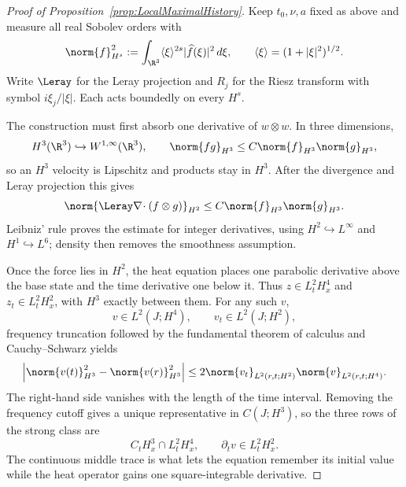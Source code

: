 \begin{proof}[Proof of Proposition~\ref{prop:LocalMaximalHistory}]
Keep \(t_0,\nu,a\) fixed as above and measure all real Sobolev orders with
\[
  \norm{f}_{H^s}^2
  :=\int_{\R^3}\langle\xi\rangle^{2s}
       |\widehat f(\xi)|^2\,d\xi,
  \qquad
  \langle\xi\rangle=(1+|\xi|^2)^{1/2}.
\]
Write \(\Leray\) for the Leray projection and \(R_j\) for the Riesz transform
with symbol \(i\xi_j/|\xi|\).  Each acts boundedly on every \(H^s\).


The construction must first absorb one derivative of \(w\otimes w\).  In three
dimensions,
\[
  H^3(\R^3)\hookrightarrow W^{1,\infty}(\R^3),
  \qquad
  \norm{fg}_{H^3}\leq C\norm{f}_{H^3}\norm{g}_{H^3},
\]
so an \(H^3\) velocity is Lipschitz and products stay in \(H^3\).  After the
divergence and Leray projection this gives
\begin{equation}
  \norm{\Leray\nabla\!\cdot(f\otimes g)}_{H^2}
  \leq C\norm{f}_{H^3}\norm{g}_{H^3}.
  \label{eq:LocalProductEstimate}
\end{equation}
Leibniz’ rule proves the estimate for integer derivatives, using
\(H^2\hookrightarrow L^\infty\) and \(H^1\hookrightarrow L^6\); density then
removes the smoothness assumption.

Once the force lies in \(H^2\), the heat equation places one parabolic derivative
above the base state and the time derivative one below it.  Thus
\(z\in L^2_tH^4_x\) and \(z_t\in L^2_tH^2_x\), with \(H^3\) exactly between
them.  For any such \(v\),
\[
  v\in L^2(J;H^4),
  \qquad
  v_t\in L^2(J;H^2),
\]
frequency truncation followed by the fundamental theorem of calculus and
Cauchy--Schwarz yields
\begin{equation}
  \left|
    \norm{v(t)}_{H^3}^2-\norm{v(r)}_{H^3}^2
  \right|
  \leq
  2\norm{v_t}_{L^2(r,t;H^2)}
   \norm{v}_{L^2(r,t;H^4)}.
  \label{eq:LocalAdjacentTrace}
\end{equation}
The right-hand side vanishes with the length of the time interval.  Removing the
frequency cutoff gives a unique representative in \(C(J;H^3)\), so
the three rows of the strong class are
\[
  C_tH^3_x\cap L^2_tH^4_x,
  \qquad
  \partial_t v\in L^2_tH^2_x.
\]
The continuous middle trace is what lets the equation remember its initial
value while the heat operator gains one square-integrable derivative.



\end{proof}
